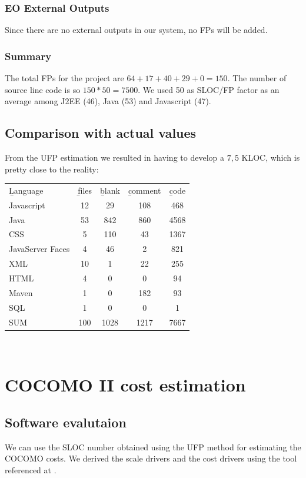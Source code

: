 \subsection{EO External Outputs}
Since there are no external outputs in our system, no FPs will be added.

\subsection{Summary}
The total FPs for the project are \(64+17+40+29+0=150\). The number of source line code is so \(150*50=7500\). We used 50 as SLOC/FP factor as an average among J2EE (46), Java (53) and Javascript (47).

\section{Comparison with actual values}
From the UFP estimation we resulted in having to develop a \(7,5\) KLOC, which is pretty close to the reality:\\
\begin{tabularx}{\linewidth}{|X|c|c|c|c|}
  \hline \b{Language} & \b{files} & \b{blank} & \b{comment} & \b{code}\\
  \Xhline{4\arrayrulewidth}Javascript & 12 & 29 & 108 & 468\\
  \hline Java & 53 & 842 & 860 & 4568\\
  \hline CSS & 5 & 110 & 43 & 1367\\
  \hline JavaServer Faces & 4 & 46 & 2 & 821\\
  \hline XML & 10 & 1 & 22 & 255\\
  \hline HTML & 4 & 0 & 0 & 94\\
  \hline Maven & 1 & 0 & 182 & 93\\
  \hline SQL & 1 & 0 & 0 & 1\\
  \Xhline{4\arrayrulewidth} SUM & 100 & 1028 & 1217 & 7667\\
  \hline
\end{tabularx}\\

\chapter{COCOMO II cost estimation}
\section{Software evalutaion}
We can use the SLOC number obtained using the UFP method for estimating the COCOMO costs. We derived the scale drivers and the cost drivers using the tool referenced at \cite{1}.\\


